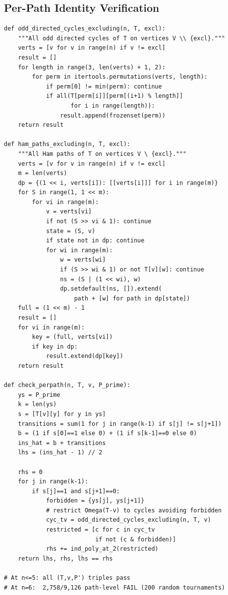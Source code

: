 \documentclass[12pt,reqno]{amsart}
\theoremstyle{plain}
\theoremstyle{definition}
\theoremstyle{remark}
\begin{document}
\subsection{Per-Path Identity Verification}

\begin{lstlisting}[caption={Per-path identity: verified n<=5, fails n=6},label=lst:perpath]
def odd_directed_cycles_excluding(n, T, excl):
    """All odd directed cycles of T on vertices V \\ {excl}."""
    verts = [v for v in range(n) if v != excl]
    result = []
    for length in range(3, len(verts) + 1, 2):
        for perm in itertools.permutations(verts, length):
            if perm[0] != min(perm): continue
            if all(T[perm[i]][perm[(i+1) % length]]
                   for i in range(length)):
                result.append(frozenset(perm))
    return result

def ham_paths_excluding(n, T, excl):
    """All Ham paths of T on vertices V \ {excl}."""
    verts = [v for v in range(n) if v != excl]
    m = len(verts)
    dp = {(1 << i, verts[i]): [[verts[i]]] for i in range(m)}
    for S in range(1, 1 << m):
        for vi in range(m):
            v = verts[vi]
            if not (S >> vi & 1): continue
            state = (S, v)
            if state not in dp: continue
            for wi in range(m):
                w = verts[wi]
                if (S >> wi & 1) or not T[v][w]: continue
                ns = (S | (1 << wi), w)
                dp.setdefault(ns, []).extend(
                    path + [w] for path in dp[state])
    full = (1 << m) - 1
    result = []
    for vi in range(m):
        key = (full, verts[vi])
        if key in dp:
            result.extend(dp[key])
    return result

def check_perpath(n, T, v, P_prime):
    ys = P_prime
    k = len(ys)
    s = [T[v][y] for y in ys]
    transitions = sum(1 for j in range(k-1) if s[j] != s[j+1])
    b = (1 if s[0]==1 else 0) + (1 if s[k-1]==0 else 0)
    ins_hat = b + transitions
    lhs = (ins_hat - 1) // 2

    rhs = 0
    for j in range(k-1):
        if s[j]==1 and s[j+1]==0:
            forbidden = {ys[j], ys[j+1]}
            # restrict Omega(T-v) to cycles avoiding forbidden
            cyc_tv = odd_directed_cycles_excluding(n, T, v)
            restricted = [c for c in cyc_tv 
                          if not (c & forbidden)]
            rhs += ind_poly_at_2(restricted)
    return lhs, rhs, lhs == rhs

# At n<=5: all (T,v,P') triples pass
# At n=6:  2,758/9,126 path-level FAIL (200 random tournaments)
\end{lstlisting}
\end{document}
